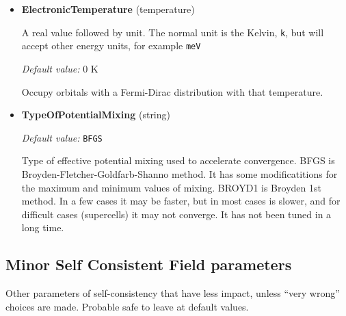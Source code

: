 \documentclass[11pt]{article}
\begin{document}
\begin{itemize}
\item{\bf ElectronicTemperature} (temperature)

   A real value followed by unit.  The normal unit is the Kelvin, \texttt{k},
   but will accept other energy units, for example \texttt{meV}

  \textit{Default value:} 0 K

   Occupy orbitals with a Fermi-Dirac distribution with that temperature.

\item{\bf TypeOfPotentialMixing} (string)

  \textit{Default value:}  \texttt{BFGS}

   Type of effective potential mixing used to accelerate convergence.
   BFGS is Broyden-Fletcher-Goldfarb-Shanno method.  It has some modificatitions
   for the maximum and minimum values of mixing.
   BROYD1 is Broyden 1st method.
   In a few cases it may be faster, but in most cases is slower,
   and for difficult cases (supercells) it may not converge.
   It has not been tuned in a long time.

\end{itemize}



\subsection{Minor Self Consistent Field parameters}

Other parameters of self-consistency that have less impact, unless ``very wrong''
choices are made.  Probable safe to leave at default values.
\end{document}
